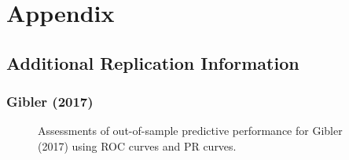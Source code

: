 \clearpage

\renewcommand{\thefigure}{A\arabic{figure}}
\setcounter{figure}{0}
\renewcommand{\thetable}{A.\arabic{table}}
\setcounter{table}{0}
\renewcommand{\thesection}{A.\arabic{section}}
\setcounter{section}{0}

\section*{\textbf{Appendix}}

\subsection*{Additional Replication Information}

\subsubsection*{Gibler (2017)}

%

\FloatBarrier

\begin{figure}
	\centering   
	\caption{Assessments of out-of-sample predictive performance for Gibler (2017) using ROC curves and PR curves.}
\end{figure}
\FloatBarrier

